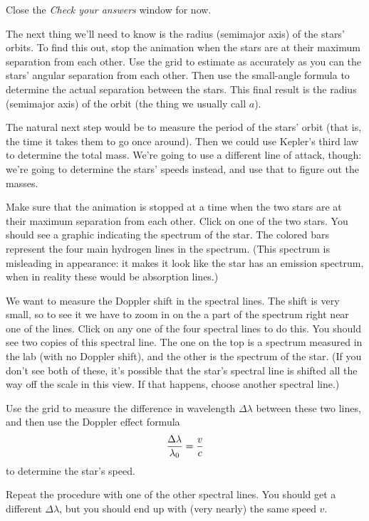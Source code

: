 \vskip 1in

Close the {\it Check your answers} window for now.

The next thing we'll need to know is the radius (semimajor axis)
of the stars' orbits.  To find this out, stop the animation when the stars are
at their maximum separation from each other.  Use the grid to 
estimate as accurately as you can the stars' angular separation
from each other.  Then use the small-angle formula to determine
the actual separation between the stars.  This final result is
the radius (semimajor axis) of the orbit (the thing we usually call $a$).

\vskip 1.5in

The natural next step would be to measure the period of the stars'
orbit (that is, the time it takes them to go once around).  Then we could
use Kepler's third law to determine the total mass.  We're going
to use a different line of attack, though: we're going to determine
the stars' speeds instead, and use that to figure out the masses.

Make sure that the animation is stopped at a time when the two stars
are at their maximum separation from each other.  Click on
one of the two stars.  You should see a graphic indicating the spectrum
of the star.  The colored bars represent the four main hydrogen lines
in the spectrum.  (This spectrum is misleading in appearance: 
it makes it look like the star has an emission spectrum, when in
reality these would be absorption lines.)  

We want to measure the
Doppler shift in the spectral lines.  The shift is very small, so 
to see it we have to zoom in on the a part of the spectrum right near
one of the lines.  Click on any one of the four spectral lines to do this.
You should see two copies of this spectral line.  
The one on the top
is a spectrum measured in the lab (with no Doppler shift), and the
other is the spectrum of the star.  
(If you don't
see both of these, it's possible that the star's spectral line
is shifted all the way off the scale in this view.  If that
happens, choose another spectral line.)

Use the grid to measure the
difference in wavelength $\Delta\lambda$ between these two lines,
and then use the Doppler effect formula
$$
{\Delta\lambda\over\lambda_0}={v\over c}
$$
to determine the star's speed.

\vskip 2in

Repeat the procedure with one of the other spectral lines.  You should
get a different $\Delta\lambda$, but you should end up with
(very nearly) the same speed $v$.


